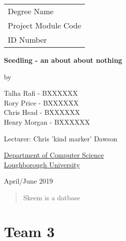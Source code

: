 \documentclass[
  12pt,
]{article}
\date{}
\begin{document}

\thispagestyle{empty}


\begin{center}

\Large{
\hfill \begin{tabular}{l}
Degree Name \\
Project Module Code \\
ID Number
\end{tabular}
}


\vspace*{\fill}

\Large{\textbf{Seedling - an about about nothing}}

\vspace*{\fill}

by

\vspace*{\fill}


Talha Rafi - BXXXXXX \\
Rory Price - BXXXXXX \\
Chris Head - BXXXXXX \\
Henry Morgan - BXXXXXX  \\


\vspace*{\fill}

Lecturer: Chris 'kind marker' Dawson
\vspace*{\fill}

\underline{Department of Computer Science} \\
\underline{Loughborough University}

\vspace*{\fill}
April/June 2019

\end{center}
\newpage




\begin{abstract}
  Skeem is a datbase
\end{abstract}

\newpage













{
\setcounter{tocdepth}{3}
\tableofcontents
}
\newpage
\hypertarget{team-3}{%
\section{Team 3}\label{team-3}}
\end{document}

